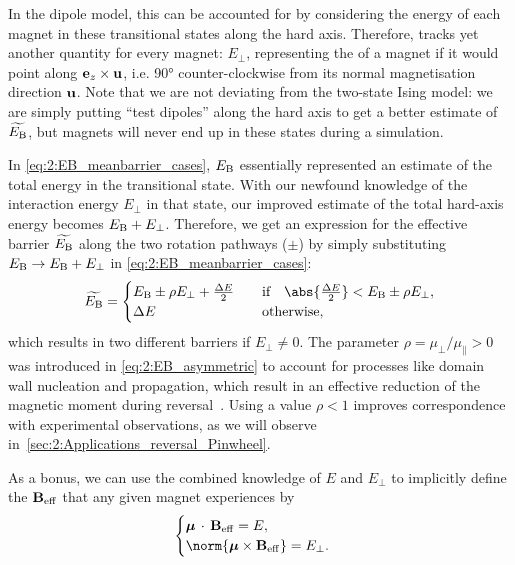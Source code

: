 In the dipole model, this can be accounted for by considering the energy of each magnet in these transitional states along the hard axis.
Therefore, \hotspice tracks yet another quantity for every magnet: $E_\perp$, representing the  of a magnet if it would point along $\boldsymbol{\mathbf{e}}_z \times \boldsymbol{\mathbf{u}}$, i.e. \ang{90} counter-clockwise from its normal magnetisation direction $\boldsymbol{\mathbf{u}}$.
Note that we are not deviating from the two-state Ising model: we are simply putting ``test dipoles'' along the hard axis to get a better estimate of $\widetilde{E_\mathrm{B}}$, but magnets will never end up in these states during a simulation. \par
In \cref{eq:2:EB_meanbarrier_cases}, $E_\mathrm{B}$ essentially represented an estimate of the total energy in the transitional state.
With our newfound knowledge of the interaction energy $E_\perp$ in that state, our improved estimate of the total hard-axis energy becomes $E_\mathrm{B} + E_\perp$.
Therefore, we get an expression for the effective barrier $\widetilde{E_\mathrm{B}}$ along the two rotation pathways ($\pm$) by simply substituting $E_\mathrm{B} \rightarrow E_\mathrm{B} + E_\perp$ in \cref{eq:2:EB_meanbarrier_cases}:
\begin{equation}
	\label{eq:2:EB_asymmetric}
	\widetilde{E_\mathrm{B}} = \begin{cases}
		E_\mathrm{B} \pm \rho E_\perp + \frac{\Delta E}{2} & \quad \text{if} \quad \abs{\frac{\Delta E}{2}} < E_\mathrm{B} \pm \rho E_\perp, \\
		\Delta E & \quad \text{otherwise}, \\
	\end{cases}
\end{equation}
which results in two different barriers if $E_\perp \neq 0$.
The parameter $\rho = \mu_\perp/\mu_\parallel > 0$ was introduced in \cref{eq:2:EB_asymmetric} to account for  processes like domain wall nucleation and propagation, which result in an effective reduction of the magnetic moment during reversal~\cite{leo2021chiral,TimeResolvedDynamicsSOT}.
Using a value $\rho < 1$ improves correspondence with experimental observations, as we will observe in~\cref{sec:2:Applications_reversal_Pinwheel}. \par
As a bonus, we can use the combined knowledge of $E$ and $E_\perp$ to implicitly define the  $\boldsymbol{\mathbf{B}}_\mathrm{eff}$ that any given magnet experiences by
\begin{equation}
	\label{eq:2:B_eff_implicit}
	\begin{cases}
		\vc{\mu} \,\cdot\, \vc{B}_\mathrm{eff} = E \mathrm{,} \\
		\norm{\vc{\mu} \times \vc{B}_\mathrm{eff}} = E_\perp  \mathrm{.}
	\end{cases}
\end{equation}
